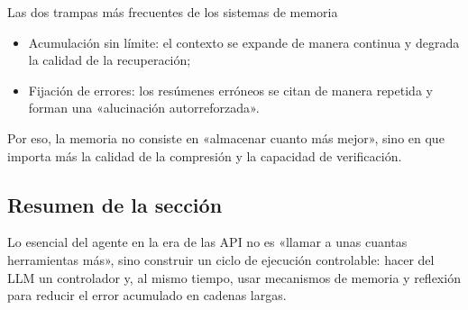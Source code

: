 \begin{warningbox}{Las dos trampas más frecuentes de los sistemas de memoria}
\begin{itemize}
    \item Acumulación sin límite: el contexto se expande de manera continua y degrada la calidad de la recuperación;
    \item Fijación de errores: los resúmenes erróneos se citan de manera repetida y forman una «alucinación autorreforzada».
\end{itemize}
Por eso, la memoria no consiste en «almacenar cuanto más mejor», sino en que importa más la calidad de la compresión y la capacidad de verificación.
\end{warningbox}

\subsection{Resumen de la sección}
Lo esencial del agente en la era de las API no es «llamar a unas cuantas herramientas más», sino construir un ciclo de ejecución controlable: hacer del LLM un controlador y, al mismo tiempo, usar mecanismos de memoria y reflexión para reducir el error acumulado en cadenas largas.

